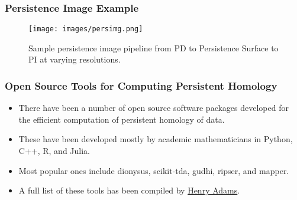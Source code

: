 		\begin{frame}
		\frametitle{Persistence Image Example}
		
						\begin{figure}
				\centering
				\texttt{[image: images/persimg.png]}
				\caption{Sample persistence image pipeline from PD to Persistence Surface to PI at varying resolutions.}
		\end{figure}
		\end{frame}
		
		\begin{frame}
		\frametitle{Open Source Tools for Computing Persistent Homology}
		\begin{itemize}
			\item There have been a number of open source software packages developed for the efficient computation of persistent homology of data.
			\item These have been developed mostly by academic mathematicians in Python, C++, R, and Julia.
			\item Most popular ones include dionysus, scikit-tda, gudhi, ripser, and mapper.
			\item A full list of these tools has been compiled by \href{https://www.math.colostate.edu/~adams/advising/appliedTopologySoftware/}{Henry Adams}.
		\end{itemize}
		
		\end{frame}
